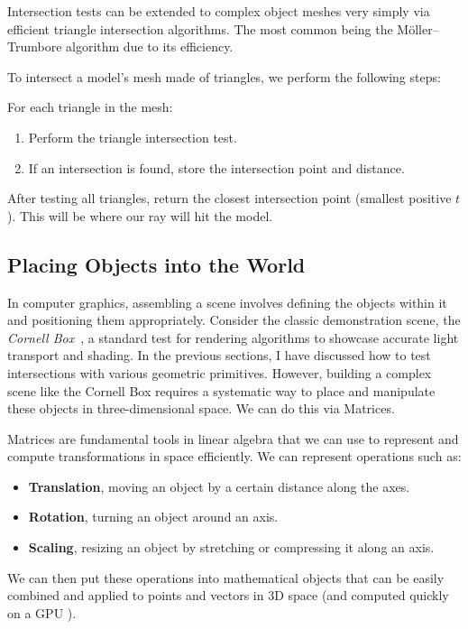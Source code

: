 \documentclass[12pt]{article}
\begin{document}
Intersection tests can be extended to complex object meshes very simply via efficient triangle intersection algorithms. The most common being the Möller–Trumbore algorithm \cite{trumboreintersection} due to its efficiency.

To intersect a model's mesh made of triangles, we perform the following steps:

For each triangle in the mesh:
\begin{enumerate}
    \item Perform the triangle intersection test.
    \item If an intersection is found, store the intersection point and distance.
\end{enumerate}

After testing all triangles, return the closest intersection point (smallest positive \(t\)). This will be where our ray will hit the model.

\subsection{Placing Objects into the World}

In computer graphics, assembling a scene involves defining the objects within it and positioning them appropriately. Consider the classic demonstration scene, the \textit{Cornell Box}~\cite{cornellbox}, a standard test for rendering algorithms to showcase accurate light transport and shading.
In the previous sections, I have discussed how to test intersections with various geometric primitives. However, building a complex scene like the Cornell Box requires a systematic way to place and manipulate these objects in three-dimensional space. We can do this via Matrices.

Matrices are fundamental tools in linear algebra that we can use to represent and compute transformations in space efficiently. We can represent operations such as:

\begin{itemize}
    \item \textbf{Translation}, moving an object by a certain distance along the axes.
    \item \textbf{Rotation}, turning an object around an axis.
    \item \textbf{Scaling}, resizing an object by stretching or compressing it along an axis.
\end{itemize}

We can then put these operations into mathematical objects that can be easily combined and applied to points and vectors in 3D space (and computed quickly on a GPU \cite{gpumatrixmultiplication}).
\end{document}
